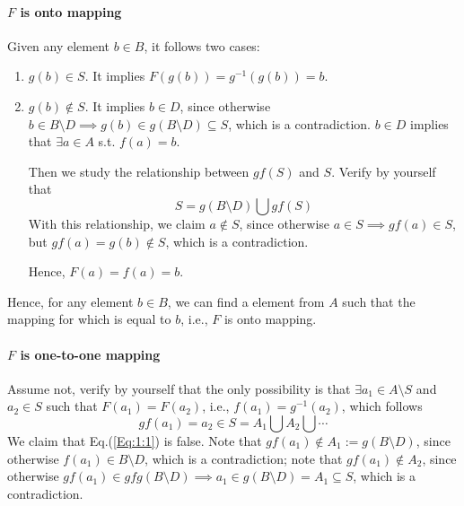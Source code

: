 \paragraph{$F$ is onto mapping} Given any element $b\in B$, it follows two cases:
\begin{enumerate}
\item
$g(b)\in S$. It implies $F(g(b))=g^{-1}(g(b))=b$.
\item
$g(b)\notin S$. It implies $b\in D$, since otherwise $b\in B\setminus D\implies g(b)\in g(B\setminus D)\subseteq S$, which is a contradiction. $b\in D$ implies that $\exists a\in A$ s.t. $f(a)=b$. 

Then we study the relationship between $gf(S)$ and $S$. Verify by yourself that
\[
S=g(B\setminus D)\bigcup gf(S)
\]
With this relationship, we claim $a\notin S$, since otherwise $a\in S\implies gf(a)\in S$, but $gf(a)=g(b)\notin S$, which is a contradiction.

Hence, $F(a)=f(a)=b$.
\end{enumerate}
Hence, for any element $b\in B$, we can find a element from $A$ such that the mapping for which is equal to $b$, i.e., $F$ is onto mapping.
\paragraph{$F$ is one-to-one mapping}
Assume not, verify by yourself that the only possibility is that $\exists a_1\in A\setminus S$ and $a_2\in S$ such that $F(a_1)=F(a_2)$, i.e., $f(a_1)=g^{-1}(a_2)$, which follows 
\begin{equation}
gf(a_1)=a_2\in S=A_1\bigcup A_2\bigcup\cdots\label{Eq:1:1}
\end{equation}
We claim that Eq.(\ref{Eq:1:1}) is false. Note that 
$gf(a_1)\notin A_1:=g(B\setminus D)$, since otherwise $f(a_1)\in B\setminus D$, which is a contradiction; note that $gf(a_1)\notin A_2$, since otherwise $gf(a_1)\in  gfg(B\setminus D)\implies a_1\in g(B\setminus D)=A_1\subseteq S$, which is a contradiction.

